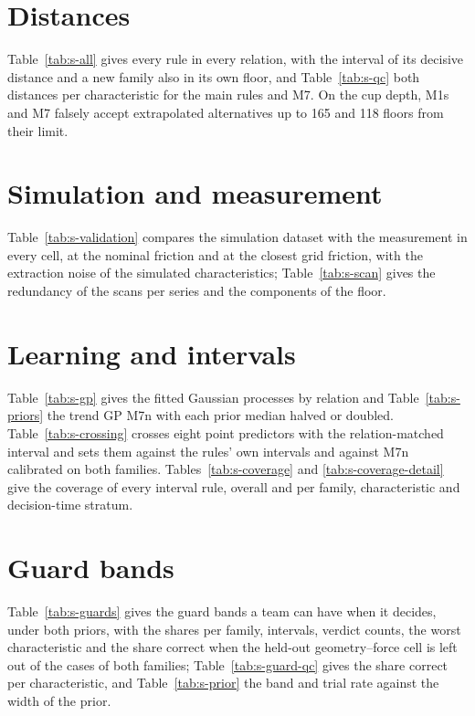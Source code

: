 \documentclass[pdflatex,sn-basic]{sn-jnl}
\begin{document}
\section{Distances}

Table~\ref{tab:s-all} gives every rule in every relation, with the interval of its decisive distance and a new family also in its own floor, and Table~\ref{tab:s-qc} both distances per characteristic for the main rules and M7. On the cup depth, M1s and M7 falsely accept extrapolated alternatives up to 165 and 118 floors from their limit.

\section{Simulation and measurement}

Table~\ref{tab:s-validation} compares the simulation dataset with the measurement in every cell, at the nominal friction and at the closest grid friction, with the extraction noise of the simulated characteristics; Table~\ref{tab:s-scan} gives the redundancy of the scans per series and the components of the floor.

\section{Learning and intervals}

Table~\ref{tab:s-gp} gives the fitted Gaussian processes by relation and Table~\ref{tab:s-priors} the trend GP M7n with each prior median halved or doubled. Table~\ref{tab:s-crossing} crosses eight point predictors with the relation-matched interval and sets them against the rules' own intervals and against M7n calibrated on both families. Tables~\ref{tab:s-coverage} and \ref{tab:s-coverage-detail} give the coverage of every interval rule, overall and per family, characteristic and decision-time stratum.

\section{Guard bands}

Table~\ref{tab:s-guards} gives the guard bands a team can have when it decides, under both priors, with the shares per family, intervals, verdict counts, the worst characteristic and the share correct when the held-out geometry--force cell is left out of the cases of both families; Table~\ref{tab:s-guard-qc} gives the share correct per characteristic, and Table~\ref{tab:s-prior} the band and trial rate against the width of the prior.
\end{document}
